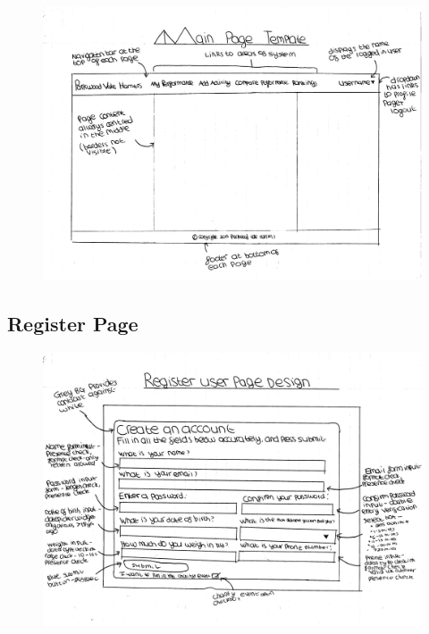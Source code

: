 \documentclass{article}[12pt,a4paper]
\begin{document}
\begin{figure}[h!]
  \includegraphics[scale=0.38]{design_ui/layout}
\end{figure}
\clearpage

\subsection{Register Page}
\begin{figure}[h!]
  \includegraphics[scale=0.55]{design_ui/register}
\end{figure}
\clearpage
\end{document}
